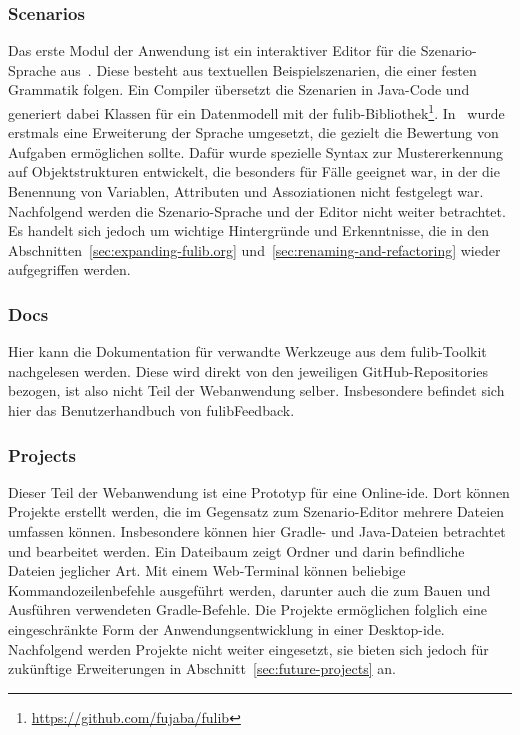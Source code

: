 \subsubsection{Scenarios}
Das erste Modul der Anwendung ist ein interaktiver Editor für die Szenario-Sprache aus~\cite{explain}.
Diese besteht aus textuellen Beispielszenarien, die einer festen Grammatik folgen.
Ein Compiler übersetzt die Szenarien in Java-Code und generiert dabei Klassen für ein Datenmodell mit der fulib-Bibliothek\footnote{\url{https://github.com/fujaba/fulib}}.
In~\cite{bachelor-thesis} wurde erstmals eine Erweiterung der Sprache umgesetzt, die gezielt die Bewertung von Aufgaben ermöglichen sollte.
Dafür wurde spezielle Syntax zur Mustererkennung auf Objektstrukturen entwickelt, die besonders für Fälle geeignet war, in der die Benennung von Variablen, Attributen und Assoziationen nicht festgelegt war.
Nachfolgend werden die Szenario-Sprache und der Editor nicht weiter betrachtet.
Es handelt sich jedoch um wichtige Hintergründe und Erkenntnisse, die in den Abschnitten~\ref{sec:expanding-fulib.org} und~\ref{sec:renaming-and-refactoring} wieder aufgegriffen werden.

\subsubsection{Docs}
Hier kann die Dokumentation für verwandte Werkzeuge aus dem fulib-Toolkit nachgelesen werden.
Diese wird direkt von den jeweiligen GitHub-Repositories bezogen, ist also nicht Teil der Webanwendung selber.
Insbesondere befindet sich hier das Benutzerhandbuch von fulibFeedback.

\subsubsection{Projects}
Dieser Teil der Webanwendung ist eine Prototyp für eine Online-\ac{ide}.
Dort können Projekte erstellt werden, die im Gegensatz zum Szenario-Editor mehrere Dateien umfassen können.
Insbesondere können hier Gradle- und Java-Dateien betrachtet und bearbeitet werden.
Ein Dateibaum zeigt Ordner und darin befindliche Dateien jeglicher Art.
Mit einem Web-Terminal können beliebige Kommandozeilenbefehle ausgeführt werden, darunter auch die zum Bauen und Ausführen verwendeten Gradle-Befehle.
Die Projekte ermöglichen folglich eine eingeschränkte Form der Anwendungsentwicklung in einer Desktop-\ac{ide}.
Nachfolgend werden Projekte nicht weiter eingesetzt, sie bieten sich jedoch für zukünftige Erweiterungen in Abschnitt~\ref{sec:future-projects} an.

